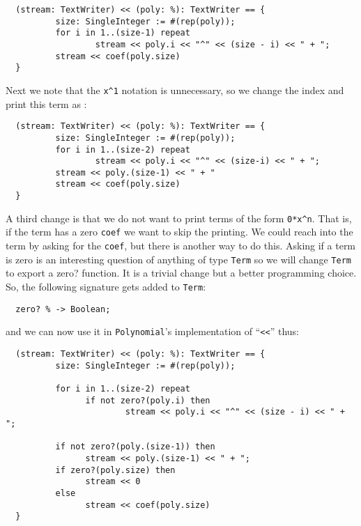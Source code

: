 \begin{small}
\begin{verbatim}
  (stream: TextWriter) << (poly: %): TextWriter == {
          size: SingleInteger := #(rep(poly));
          for i in 1..(size-1) repeat
                  stream << poly.i << "^" << (size - i) << " + ";
          stream << coef(poly.size)
  }
\end{verbatim}
\end{small}

Next we note that the \verb'x^1' notation is unnecessary,
so we change the index
and print this term as :
     
\begin{small}
\begin{verbatim}
  (stream: TextWriter) << (poly: %): TextWriter == {
          size: SingleInteger := #(rep(poly));
          for i in 1..(size-2) repeat 
                  stream << poly.i << "^" << (size-i) << " + ";
          stream << poly.(size-1) << " + "
          stream << coef(poly.size)
  }
\end{verbatim}
\end{small}

A third change is that we do not want to print terms of the form \verb+0*x^n+.
That is, if the term has a zero \verb"coef"
we want to skip the printing. We
could reach into the term by asking for the \verb"coef",
but there is another
way to do this. Asking if a term is zero is an interesting question of
anything of type \verb"Term" so we will change \verb"Term" to export a zero? function.
It is a trivial change but a better programming choice. So, the following
signature gets added to \verb"Term":

\begin{small}
\begin{verbatim}
  zero? % -> Boolean;
\end{verbatim}
\end{small}

and we can now use it in \verb"Polynomial"'s implementation of ``\verb+<<+'' thus:
     
\begin{small}
\begin{verbatim}
  (stream: TextWriter) << (poly: %): TextWriter == {
          size: SingleInteger := #(rep(poly));

          for i in 1..(size-2) repeat 
                if not zero?(poly.i) then 
                        stream << poly.i << "^" << (size - i) << " + ";

          if not zero?(poly.(size-1)) then 
                stream << poly.(size-1) << " + ";
          if zero?(poly.size) then
                stream << 0
          else
                stream << coef(poly.size)
  }
\end{verbatim}
\end{small}

